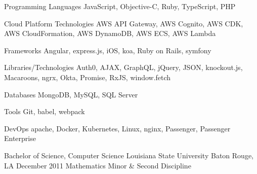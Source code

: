 \documentclass[letterpaper]{awesome-cv}
\begin{document}
\begin{cventries}
\end{cventries}

\begin{cvskills}
  \cvskill
    {Programming Languages}
    {JavaScript, Objective-C, Ruby, TypeScript, PHP}

  \cvskill
    {Cloud Platform Technologies}
    {AWS API Gateway, AWS Cognito, AWS CDK, AWS CloudFormation, AWS DynamoDB, AWS ECS, AWS Lambda}

  \cvskill
    {Frameworks}
    {Angular, express.js, iOS, koa, Ruby on Rails, symfony}

  \cvskill
    {Libraries/Technologies}
    {Auth0, AJAX, GraphQL, jQuery, JSON, knockout.js, Macaroons, ngrx, Okta, Promise, RxJS, window.fetch}

  \cvskill
    {Databases}
    {MongoDB, MySQL, SQL Server}

  \cvskill
    {Tools}
    {Git, babel, webpack}

  \cvskill
    {DevOps}
    {apache, Docker, Kubernetes, Linux, nginx, Passenger, Passenger Enterprise}
\end{cvskills}

\begin{cventries}
  \cventry
    {Bachelor of Science, Computer Science}
    {Louisiana State University}
    {Baton Rouge, LA}
    {December 2011}
    {Mathematics Minor \& Second Discipline}
\end{cventries}
\end{document}

